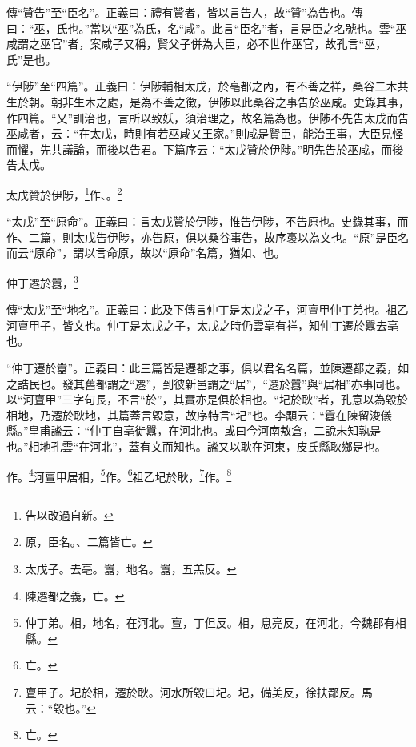 {\noindent\zhuan{}\fzbyks 傳“贊告”至“臣名”。正義曰：禮有贊者，皆以言告人，故“贊”為告也。傳曰：“巫，氏也。”當以“巫”為氏，名“咸”。此言“臣名”者，言是臣之名號也。雲“巫咸謂之巫官”者，案咸子又稱，賢父子併為大臣，必不世作巫官，故孔言“巫，氏”是也。 \par}

{\noindent\shu{}\fzkt “伊陟”至“四篇”。正義曰：伊陟輔相太戊，於亳都之內，有不善之祥，桑谷二木共生於朝。朝非生木之處，是為不善之徵，伊陟以此桑谷之事告於巫咸。史錄其事，作四篇。“乂”訓治也，言所以致妖，須治理之，故名篇為也。伊陟不先告太戊而告巫咸者，云：“在太戊，時則有若巫咸乂王家。”則咸是賢臣，能治王事，大臣見怪而懼，先共議論，而後以告君。下篇序云：“太戊贊於伊陟。”明先告於巫咸，而後告太戊。 \par}

太戊贊於伊陟，\footnote{告以改過自新。}作、。\footnote{原，臣名。、二篇皆亡。}

{\noindent\shu{}\fzkt “太戊”至“原命”。正義曰：言太戊贊於伊陟，惟告伊陟，不告原也。史錄其事，而作、二篇，則太戊告伊陟，亦告原，俱以桑谷事告，故序裛以為文也。“原”是臣名而云“原命”，謂以言命原，故以“原命”名篇，猶如、也。 \par}

仲丁遷於囂，\footnote{太戊子。去亳。囂，地名。囂，五羔反。}

{\noindent\zhuan{}\fzbyks 傳“太戊”至“地名”。正義曰：此及下傳言仲丁是太戊之子，河亶甲仲丁弟也。祖乙河亶甲子，皆文也。仲丁是太戊之子，太戊之時仍雲亳有祥，知仲丁遷於囂去亳也。 \par}

{\noindent\shu{}\fzkt “仲丁遷於囂”。正義曰：此三篇皆是遷都之事，俱以君名名篇，並陳遷都之義，如之誥民也。發其舊都謂之“遷”，到彼新邑謂之“居”，“遷於囂”與“居相”亦事同也。以“河亶甲”三字句長，不言“於”，其實亦是俱於相也。“圮於耿”者，孔意以為毀於相地，乃遷於耿地，其篇蓋言毀意，故序特言“圮”也。李顒云：“囂在陳留浚儀縣。”皇甫謐云：“仲丁自亳徙囂，在河北也。或曰今河南敖倉，二說未知孰是也。”相地孔雲“在河北”，蓋有文而知也。謐又以耿在河東，皮氏縣耿鄉是也。 \par}

作。\footnote{陳遷都之義，亡。}河亶甲居相，\footnote{仲丁弟。相，地名，在河北。亶，丁但反。相，息亮反，在河北，今魏郡有相縣。}作。\footnote{亡。}祖乙圮於耿，\footnote{亶甲子。圮於相，遷於耿。河水所毀曰圮。圮，備美反，徐扶鄙反。馬云：“毀也。”}作。\footnote{亡。}

